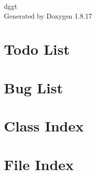 \let\mypdfximage\pdfximage\def\pdfximage{\immediate\mypdfximage}\documentclass[twoside]{book}
\newcommand{\+}{\discretionary{\mbox{\scriptsize$\hookleftarrow$}}{}{}}
\newcommand{\clearemptydoublepage}{%
  \newpage{\pagestyle{empty}\cleardoublepage}%
}
\begin{document}
\hypersetup{pageanchor=false,
             bookmarksnumbered=true,
             pdfencoding=unicode
            }
\begin{titlepage}
\vspace*{7cm}
\begin{center}%
{\Large dggt }\\
\vspace*{1cm}
{\large Generated by Doxygen 1.8.17}\\
\end{center}
\end{titlepage}
\clearemptydoublepage
{}
\tableofcontents
\clearemptydoublepage
{}
\hypersetup{pageanchor=true}

\chapter{Todo List}
\label{todo}

\chapter{Bug List}
\label{bug}

\chapter{Class Index}

\chapter{File Index}

\end{document}
